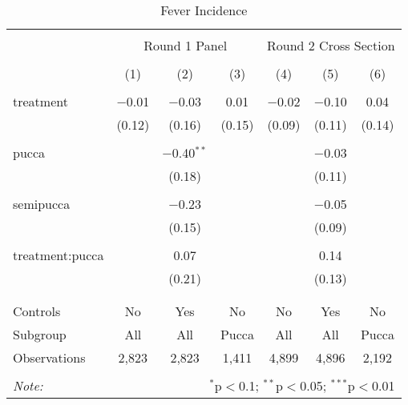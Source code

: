 
\begin{table}[!htbp] \centering 
  \caption{Fever Incidence} 
  \label{tbl:Fever Incidence} 
\begin{tabular}{@{\extracolsep{5pt}}lcccccc} 
\\[-1.8ex]\hline 
\hline \\[-1.8ex] 
 & \multicolumn{3}{c}{Round 1 Panel} & \multicolumn{3}{c}{Round 2 Cross Section} \\ 
\\[-1.8ex] & (1) & (2) & (3) & (4) & (5) & (6)\\ 
\hline \\[-1.8ex] 
 treatment & $-$0.01 & $-$0.03 & 0.01 & $-$0.02 & $-$0.10 & 0.04 \\ 
  & (0.12) & (0.16) & (0.15) & (0.09) & (0.11) & (0.14) \\ 
  & & & & & & \\ 
 pucca &  & $-$0.40$^{**}$ &  &  & $-$0.03 &  \\ 
  &  & (0.18) &  &  & (0.11) &  \\ 
  & & & & & & \\ 
 semipucca &  & $-$0.23 &  &  & $-$0.05 &  \\ 
  &  & (0.15) &  &  & (0.09) &  \\ 
  & & & & & & \\ 
 treatment:pucca &  & 0.07 &  &  & 0.14 &  \\ 
  &  & (0.21) &  &  & (0.13) &  \\ 
  & & & & & & \\ 
\hline \\[-1.8ex] 
Controls & No & Yes & No & No & Yes & No \\ 
Subgroup & All & All & Pucca & All & All & Pucca \\ 
Observations & 2,823 & 2,823 & 1,411 & 4,899 & 4,896 & 2,192 \\ 
\hline 
\hline \\[-1.8ex] 
\textit{Note:}  & \multicolumn{6}{r}{$^{*}$p$<$0.1; $^{**}$p$<$0.05; $^{***}$p$<$0.01} \\ 
\end{tabular} 
\end{table} 
